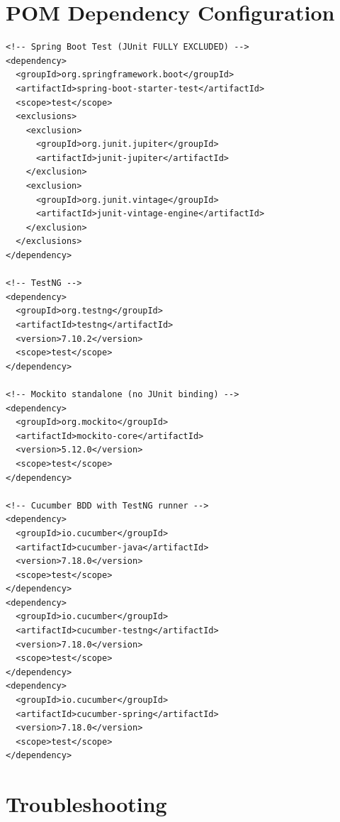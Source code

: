 \documentclass[12pt,a4paper]{article}
\begin{document}
\section{POM Dependency Configuration}

\begin{lstlisting}[style=xmlStyle, caption={Key test dependencies in pom.xml}]
<!-- Spring Boot Test (JUnit FULLY EXCLUDED) -->
<dependency>
  <groupId>org.springframework.boot</groupId>
  <artifactId>spring-boot-starter-test</artifactId>
  <scope>test</scope>
  <exclusions>
    <exclusion>
      <groupId>org.junit.jupiter</groupId>
      <artifactId>junit-jupiter</artifactId>
    </exclusion>
    <exclusion>
      <groupId>org.junit.vintage</groupId>
      <artifactId>junit-vintage-engine</artifactId>
    </exclusion>
  </exclusions>
</dependency>

<!-- TestNG -->
<dependency>
  <groupId>org.testng</groupId>
  <artifactId>testng</artifactId>
  <version>7.10.2</version>
  <scope>test</scope>
</dependency>

<!-- Mockito standalone (no JUnit binding) -->
<dependency>
  <groupId>org.mockito</groupId>
  <artifactId>mockito-core</artifactId>
  <version>5.12.0</version>
  <scope>test</scope>
</dependency>

<!-- Cucumber BDD with TestNG runner -->
<dependency>
  <groupId>io.cucumber</groupId>
  <artifactId>cucumber-java</artifactId>
  <version>7.18.0</version>
  <scope>test</scope>
</dependency>
<dependency>
  <groupId>io.cucumber</groupId>
  <artifactId>cucumber-testng</artifactId>
  <version>7.18.0</version>
  <scope>test</scope>
</dependency>
<dependency>
  <groupId>io.cucumber</groupId>
  <artifactId>cucumber-spring</artifactId>
  <version>7.18.0</version>
  <scope>test</scope>
</dependency>
\end{lstlisting}

\section{Troubleshooting}
\end{document}
